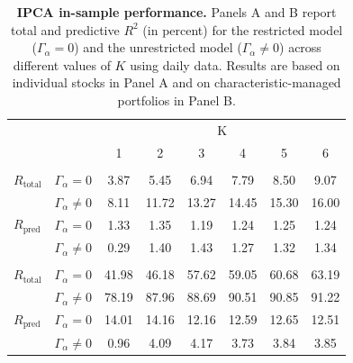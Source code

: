 \documentclass[
  12pt,
  a4paper,
  openany]{scrbook}
\begin{document}
\begin{table}
\centering
\small
\caption[IPCA in-sample performance.]%
{%
\textbf{IPCA in-sample performance.}
Panels A and B report total and predictive $R^2$ (in percent) for the restricted model ($\Gamma_\alpha = 0$) and the unrestricted model ($\Gamma_\alpha \neq 0$) across different values of $K$ using daily data. Results are based on individual stocks in Panel A and on characteristic-managed portfolios in Panel B. 
}
\label{tbl-ipca_results}
\vspace{5pt} %
\begin{tabular}{lccccccc}
\toprule
 &  & \multicolumn{6}{c}{K} \\
\cmidrule(lr){3-8}
 &  & 1 & 2 & 3 & 4 & 5 & 6 \\
\midrule\addlinespace[2.5pt]
\multicolumn{8}{l}{Panel A: Individual stocks ($r_t$)} \\[2.5pt]
\midrule\addlinespace[2.5pt]
$R_{\text{total}}$      & $\Gamma_{\alpha} = 0$     & 3.87 & 5.45 & 6.94 & 7.79 & 8.50 & 9.07 \\
                            & $\Gamma_{\alpha} \neq 0$  & 8.11 & 11.72 & 13.27 & 14.45 & 15.30 & 16.00 \\
$R_{\text{pred}}$ & $\Gamma_{\alpha} = 0$     & 1.33 & 1.35 & 1.19 & 1.24 & 1.25 & 1.24 \\
                            & $\Gamma_{\alpha} \neq 0$  & 0.29 & 1.40 & 1.43 & 1.27 & 1.32 & 1.34 \\
\midrule\addlinespace[2.5pt]
\multicolumn{8}{l}{Panel B: Managed portfolios ($x_t$)} \\[2.5pt]
\midrule\addlinespace[2.5pt]
$R_{\text{total}}$      & $\Gamma_{\alpha} = 0$     & 41.98 & 46.18 & 57.62 & 59.05 & 60.68 & 63.19 \\
                            & $\Gamma_{\alpha} \neq 0$  & 78.19 & 87.96 & 88.69 & 90.51 & 90.85 & 91.22 \\
$R_{\text{pred}}$ & $\Gamma_{\alpha} = 0$     & 14.01 & 14.16 & 12.16 & 12.59 & 12.65 & 12.51 \\
                            & $\Gamma_{\alpha} \neq 0$  & 0.96 & 4.09 & 4.17 & 3.73 & 3.84 & 3.85 \\
\bottomrule
\end{tabular}
\end{table}
\end{document}
